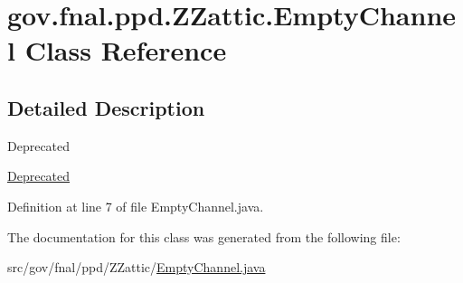 \hypertarget{classgov_1_1fnal_1_1ppd_1_1ZZattic_1_1EmptyChannel}{\section{gov.\-fnal.\-ppd.\-Z\-Zattic.\-Empty\-Channel Class Reference}
\label{classgov_1_1fnal_1_1ppd_1_1ZZattic_1_1EmptyChannel}
}


\subsection{Detailed Description}
\begin{DoxyRefDesc}{Deprecated}
\item[\hyperlink{deprecated__deprecated000012}{Deprecated}]\end{DoxyRefDesc}


Definition at line 7 of file Empty\-Channel.\-java.



The documentation for this class was generated from the following file\-:\begin{DoxyCompactItemize}
\item 
src/gov/fnal/ppd/\-Z\-Zattic/\hyperlink{EmptyChannel_8java}{Empty\-Channel.\-java}\end{DoxyCompactItemize}
